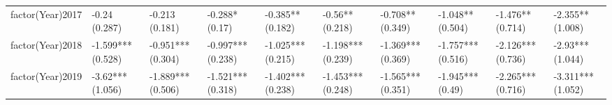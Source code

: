 \begin{table}[ht]
\begin{tabular}{llllllllll}
  factor(Year)2017 & -0.24 (0.287) & -0.213 (0.181) & -0.288* (0.17) & -0.385** (0.182) & -0.56** (0.218) & -0.708** (0.349) & -1.048** (0.504) & -1.476** (0.714) & -2.355** (1.008) \\ 
  factor(Year)2018 & -1.599*** (0.528) & -0.951*** (0.304) & -0.997*** (0.238) & -1.025*** (0.215) & -1.198*** (0.239) & -1.369*** (0.369) & -1.757*** (0.516) & -2.126*** (0.736) & -2.93*** (1.044) \\ 
  factor(Year)2019 & -3.62*** (1.056) & -1.889*** (0.506) & -1.521*** (0.318) & -1.402*** (0.238) & -1.453*** (0.248) & -1.565*** (0.351) & -1.945*** (0.49) & -2.265*** (0.716) & -3.311*** (1.052) \\ 
   \bottomrule
\end{tabular}
\endgroup
\end{table}
